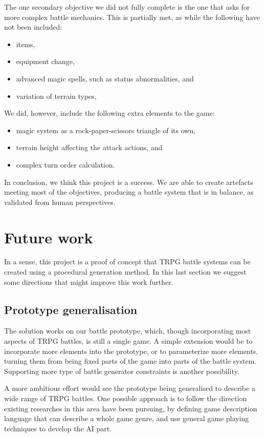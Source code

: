 The one secondary objective we did not fully complete is the one that asks for more complex battle mechanics. This is partially met, as while the following have not been included:
\begin{itemize}
	\item items, 
	\item equipment change,
	\item advanced magic spells, such as status abnormalities, and
	\item variation of terrain types,
\end{itemize}
We did, however, include the following extra elements to the game:
\begin{itemize}
	\item magic system as a rock-paper-scissors triangle of its own,
	\item terrain height affecting the attack actions, and
	\item complex turn order calculation.
\end{itemize}

In conclusion, we think this project is a success. We are able to create artefacts meeting most of the objectives, producing a battle system that is in balance, as validated from human perspectives.

\section{Future work}

In a sense, this project is a proof of concept that TRPG battle systems can be created using a procedural generation method. In this last section we suggest some directions that might improve this work further.

\subsection{Prototype generalisation}

The solution works on our battle prototype, which, though incorporating most aspects of TRPG battles, is still a single game. A simple extension would be to incorporate more elements into the prototype, or to parameterize more elements, turning them from being fixed parts of the game into parts of the battle system. Supporting more type of battle generator constraints is another possibility.

A more ambitious effort would see the prototype being generalised to describe a wide range of TRPG battles. One possible approach is to follow the direction existing researches in this area have been pursuing, by defining game description language that can describe a whole game genre, and use general game playing techniques to develop the AI part.

